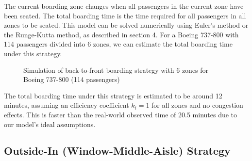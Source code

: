 \documentclass[12pt]{article}
\begin{document}
The current boarding zone changes when all passengers in the current zone have been seated. The total boarding time is the time required for all passengers in all zones to be seated. This model can be solved numerically using Euler's method or the Runge-Kutta method, as described in section 4. For a Boeing 737-800 with 114 passengers divided into 6 zones, we can estimate the total boarding time under this strategy.

\begin{figure}[H]
\centering
{}
\caption{Simulation of back-to-front boarding strategy with 6 zones for Boeing 737-800 (114 passengers)}
\end{figure}

The total boarding time under this strategy is estimated to be around 12 minutes, assuming an efficiency coefficient $k_i = 1$ for all zones and no congestion effects. This is faster than the real-world observed time of 20.5 minutes due to our model's ideal assumptions.

\subsection{Outside-In (Window-Middle-Aisle) Strategy}
\end{document}
